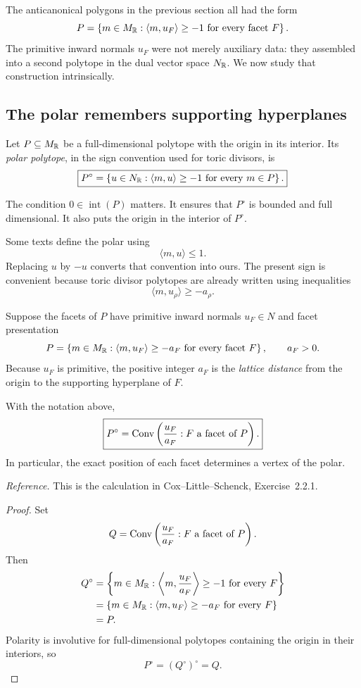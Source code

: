 The anticanonical polygons in the previous section all had the form
\[
P=
\left\{
 m\in M_{\mathbb{R}}:
 \langle m,u_F\rangle\geq-1
 \text{ for every facet }F
\right\}.
\]
The primitive inward normals \(u_F\) were not merely auxiliary data:
they assembled into a second polytope in the dual vector space
\(N_{\mathbb{R}}\). We now study that construction intrinsically.

\subsection{The polar remembers supporting hyperplanes}

Let \(P\subseteq M_{\mathbb{R}}\) be a full-dimensional polytope with the
origin in its interior. Its \emph{polar polytope}, in the sign
convention used for toric divisors, is
\[
\boxed{
P^\circ
=
\left\{
 u\in N_{\mathbb{R}}:
 \langle m,u\rangle\geq-1
 \text{ for every }m\in P
\right\}.
}
\]

The condition \(0\in\operatorname{int}(P)\) matters. It ensures that
\(P^\circ\) is bounded and full dimensional. It also puts the origin
in the interior of \(P^\circ\).

\begin{observation}
Some texts define the polar using
\[
\langle m,u\rangle\leq1.
\]
Replacing \(u\) by \(-u\) converts that convention into ours. The
present sign is convenient because toric divisor polytopes are already
written using inequalities
\[
\langle m,u_\rho\rangle\geq-a_\rho.
\]
\end{observation}

Suppose the facets of \(P\) have primitive inward normals \(u_F\in N\)
and facet presentation
\[
P=
\left\{
 m\in M_{\mathbb{R}}:
 \langle m,u_F\rangle\geq-a_F
 \text{ for every facet }F
\right\},
\qquad a_F>0.
\]
Because \(u_F\) is primitive, the positive integer \(a_F\) is the
\emph{lattice distance} from the origin to the supporting hyperplane
of \(F\).

\begin{proposition}
\label{prop:polar-from-facet-presentation}
With the notation above,
\[
\boxed{
P^\circ
=
\operatorname{Conv}
\left(
\frac{u_F}{a_F}:F\text{ a facet of }P
\right).
}
\]
In particular, the exact position of each facet determines a vertex of
the polar.
\end{proposition}

\noindent
\textit{Reference.}
This is the calculation in Cox--Little--Schenck, Exercise~2.2.1.

\begin{proof}
Set
\[
Q=
\operatorname{Conv}
\left(
\frac{u_F}{a_F}:F\text{ a facet of }P
\right).
\]
Then
\[
\begin{aligned}
Q^\circ
&=
\left\{
m\in M_{\mathbb{R}}:
\left\langle m,\frac{u_F}{a_F}\right\rangle\geq-1
\text{ for every }F
\right\}\\
&=
\left\{
m\in M_{\mathbb{R}}:
\langle m,u_F\rangle\geq-a_F
\text{ for every }F
\right\}\\
&=P.
\end{aligned}
\]
Polarity is involutive for full-dimensional polytopes containing the
origin in their interiors, so
\[
P^\circ=(Q^\circ)^\circ=Q.
\]
\end{proof}

